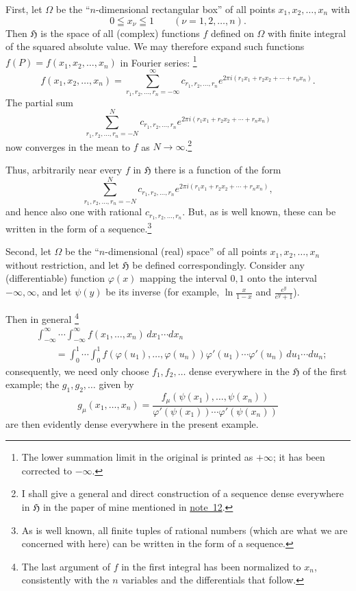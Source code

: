 \documentclass[fontsize=13pt,paper=b5,twoside,bookmarkpackage=false]{scrartcl}
\newcommand{\fnref}[1]{\hyperref[fn:#1]{note~#1}}
\newcounter{translatornote}
\newcommand{\tnote}[1]{%
  \begingroup\stepcounter{translatornote}%
  \renewcommand{\thefootnote}{T\arabic{translatornote}}%
  \footnote[0]{#1}\endgroup}
\begin{document}
First, let $\Omega$ be the ``$n$-dimensional rectangular box'' of all points $x_1,x_2,\ldots,x_n$ with
\[
 0\leqq x_\nu\leqq1\qquad(\nu=1,2,\ldots,n).
\]
Then $\mathfrak{H}$ is the space of all (complex) functions $f$ defined on $\Omega$ with finite integral of the squared absolute value. We may therefore expand such functions $f(P)=f(x_1,x_2,\ldots,x_n)$ in Fourier series:\tnote{The lower summation limit in the original is printed as $+\infty$; it has been corrected to $-\infty$.}
\[
 f(x_1,x_2,\ldots,x_n)
 =\sum_{r_1,r_2,\ldots,r_n=-\infty}^{\infty}
 c_{r_1,r_2,\ldots,r_n}e^{2\pi i(r_1x_1+r_2x_2+\cdots+r_nx_n)}.
\]
The partial sum
\[
 \sum_{r_1,r_2,\ldots,r_n=-N}^{N}
 c_{r_1,r_2,\ldots,r_n}e^{2\pi i(r_1x_1+r_2x_2+\cdots+r_nx_n)}
\]
now converges in the mean to $f$ as $N\to\infty$.\footnote[38]{\label{fn:38}I shall give a general and direct construction of a sequence dense everywhere in $\mathfrak{H}$ in the paper of mine mentioned in \fnref{12}.}

Thus, arbitrarily near every $f$ in $\mathfrak{H}$ there is a function of the form
\[
 \sum_{r_1,r_2,\ldots,r_n=-N}^{N}
 c_{r_1,r_2,\ldots,r_n}e^{2\pi i(r_1x_1+r_2x_2+\cdots+r_nx_n)},
\]
and hence also one with rational $c_{r_1,r_2,\ldots,r_n}$. But, as is well known, these can be written in the form of a sequence.\footnote[39]{\label{fn:39}As is well known, all finite tuples of rational numbers (which are what we are concerned with here) can be written in the form of a sequence.}

Second, let $\Omega$ be the ``$n$-dimensional (real) space'' of all points $x_1,x_2,\ldots,x_n$ without restriction, and let $\mathfrak{H}$ be defined correspondingly. Consider any (differentiable) function $\varphi(x)$ mapping the interval $0,1$ onto the interval $-\infty,\infty$, and let $\psi(y)$ be its inverse (for example, $\ln\frac{x}{1-x}$ and $\frac{e^y}{e^y+1}$).

Then in general\tnote{The last argument of $f$ in the first integral has been normalized to $x_n$, consistently with the $n$ variables and the differentials that follow.}
\begin{align*}
 &\int_{-\infty}^{\infty}\cdots\int_{-\infty}^{\infty}
 f(x_1,\ldots,x_n)\,dx_1\cdots dx_n\\
 &\qquad=\int_0^1\cdots\int_0^1
 f(\varphi(u_1),\ldots,\varphi(u_n))
 \varphi'(u_1)\cdots\varphi'(u_n)\,du_1\cdots du_n;
\end{align*}
consequently, we need only choose $f_1,f_2,\ldots$ dense everywhere in the $\mathfrak{H}$ of the first example; the $g_1,g_2,\ldots$ given by
\[
 g_\mu(x_1,\ldots,x_n)
 =\frac{f_\mu(\psi(x_1),\ldots,\psi(x_n))}
 {\varphi'(\psi(x_1))\cdots\varphi'(\psi(x_n))}
\]
are then evidently dense everywhere in the present example.
\end{document}
